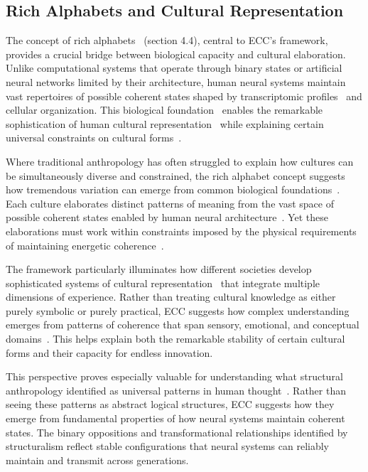 \subsection*{Rich Alphabets and Cultural Representation}

The concept of rich alphabets~ (section 4.4), central to ECC's framework, provides a crucial bridge between biological capacity and cultural elaboration. Unlike computational systems that operate through binary states or artificial neural networks limited by their architecture, human neural systems maintain vast repertoires of possible coherent states shaped by transcriptomic profiles~ and cellular organization. This biological foundation~ enables the remarkable sophistication of human cultural representation~ while explaining certain universal constraints on cultural forms~\cite{shore1996culture,ingold2011being}.

Where traditional anthropology has often struggled to explain how cultures can be simultaneously diverse and constrained, the rich alphabet concept suggests how tremendous variation can emerge from common biological foundations~. Each culture elaborates distinct patterns of meaning from the vast space of possible coherent states enabled by human neural architecture~. Yet these elaborations must work within constraints imposed by the physical requirements~ of maintaining energetic coherence~\cite{wagner2016invention,strathern2004partial}.

The framework particularly illuminates how different societies develop sophisticated systems of cultural representation~ that integrate multiple dimensions of experience. Rather than treating cultural knowledge as either purely symbolic or purely practical, ECC suggests how complex understanding emerges from patterns of coherence that span sensory, emotional, and conceptual domains~\cite{geertz1973interpretation,toren1999mind}. This helps explain both the remarkable stability of certain cultural forms and their capacity for endless innovation.

This perspective proves especially valuable for understanding what structural anthropology identified as universal patterns in human thought~\cite{levistrauss1963structural}. Rather than seeing these patterns as abstract logical structures, ECC suggests how they emerge from fundamental properties of how neural systems maintain coherent states. The binary oppositions and transformational relationships identified by structuralism reflect stable configurations that neural systems can reliably maintain and transmit across generations.

